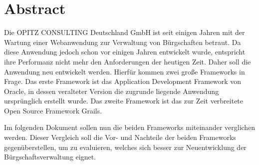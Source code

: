 \section*{Abstract}
Die OPITZ CONSULTING Deutschland GmbH ist seit einigen Jahren mit der Wartung einer Webanwendung zur Verwaltung von Bürgschaften betraut. Da diese Anwendung jedoch schon vor einigen Jahren entwickelt wurde, entspricht ihre Performanz nicht mehr den Anforderungen der heutigen Zeit. Daher soll die Anwendung neu entwickelt werden. Hierfür kommen zwei große Frameworks in Frage. Das erste Framework ist das Application Development Framework von Oracle, in dessen veralteter Version  die zugrunde liegende Anwendung ursprünglich erstellt wurde. Das zweite Framework ist das zur Zeit verbreitete Open Source Framework Grails.

Im folgenden Dokument sollen nun die beiden Frameworks miteinander verglichen werden. Dieser Vergleich soll die Vor- und Nachteile der beiden Frameworks gegenüberstellen, um zu evaluieren, welches sich besser zur Neuentwicklung der Bürgschaftsverwaltung eignet.